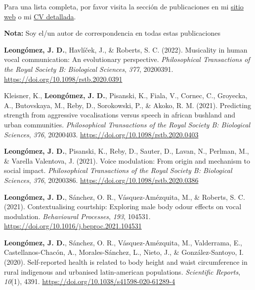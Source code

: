 \documentclass[11pt,a4paper,]{awesome-cv}
\begin{document}
Para una lista completa, por favor visita la sección de publicaciones en
mi \href{https://jdleongomez.info/es/publication/}{sitio web} o mi
\href{https://jdleongomez.info/es/files/jdl_cv_es.pdf}{CV detallada}.

\begin{footnotesize}
\textbf{Nota:} Soy el/un autor de correspondencia en todas estas publicaciones
\end{footnotesize}

\begingroup
\setlength{\parindent}{-0.5in}
\setlength{\leftskip}{0.5in}

\hypertarget{refs_featured}{}
\leavevmode{}%
\textbf{Leongómez, J. D.}, Havlíček, J., \& Roberts, S. C. (2022).
Musicality in human vocal communication: {An} evolutionary perspective.
\emph{Philosophical Transactions of the Royal Society B: Biological
Sciences}, \emph{377}, 20200391.
\url{https://doi.org/10.1098/rstb.2020.0391}

\leavevmode{}%
Kleisner, K., \textbf{Leongómez, J. D.}, Pisanski, K., Fiala, V.,
Cornec, C., Groyecka, A., Butovskaya, M., Reby, D., Sorokowski, P., \&
Akoko, R. M. (2021). Predicting strength from aggressive vocalisations
versus speech in african bushland and urban communities.
\emph{Philosophical Transactions of the Royal Society B: Biological
Sciences}, \emph{376}, 20200403.
\url{https://doi.org/10.1098/rstb.2020.0403}

\leavevmode{}%
\textbf{Leongómez, J. D.}, Pisanski, K., Reby, D., Sauter, D., Lavan,
N., Perlman, M., \& Varella Valentova, J. (2021). Voice modulation:
{From} origin and mechanism to social impact. \emph{Philosophical
Transactions of the Royal Society B: Biological Sciences}, \emph{376},
20200386. \url{https://doi.org/10.1098/rstb.2020.0386}

\leavevmode{}%
\textbf{Leongómez, J. D.}, Sánchez, O. R., Vásquez-Amézquita, M., \&
Roberts, S. C. (2021). Contextualising courtship: Exploring male body
odour effects on vocal modulation. \emph{Behavioural Processes},
\emph{193}, 104531. \url{https://doi.org/10.1016/j.beproc.2021.104531}

\leavevmode{}%
\textbf{Leongómez, J. D.}, Sánchez, O. R., Vásquez-Amézquita, M.,
Valderrama, E., Castellanos-Chacón, A., Morales-Sánchez, L., Nieto, J.,
\& González-Santoyo, I. (2020). Self-reported health is related to body
height and waist circumference in rural indigenous and urbanised
latin-american populations. \emph{Scientific Reports}, \emph{10}(1),
4391. \url{https://doi.org/10.1038/s41598-020-61289-4}
\end{document}
